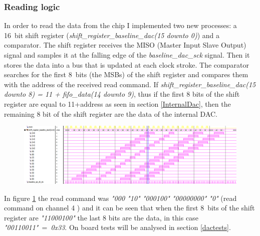 \subsubsection{Reading logic}
In order to read the data from the chip I implemented two new processes: a 16~bit shift register (\textit{shift\_register\_baseline\_dac(15 downto 0)}) and a comparator.
The shift register receives the MISO (Master Input Slave Output) signal and samples it at the falling edge of the \textit{baseline\_dac\_sck} signal. Then it stores the data into a bus that is updated at each clock stroke.
The comparator searches for the first 8~bits (the MSBs) of the shift register and compares them with the address of the received read command.
If \textit{shift\_register\_baseline\_dac(15 downto 8) = 11 + fifo\_data(14 downto 9)}, thus if the first 8 bits of the shift register are equal to 11+address as seen in section \ref{InternalDac}, then the remaining 8 bit of the shift register are the data of the internal DAC.
\begin{figure}[H]
	\centering
	\includegraphics[width=1.0\linewidth]{IMG/ch4/DACsimulations/FSMshiftregister}
	\caption{}
	\label{fig:fsmshiftregister}
\end{figure}
\noindent In figure \ref{fig:fsmshiftregister} the read command was \textit{"000 "10" "000100" "00000000" "0"} (read command on channel 4 ) and it can be seen that when the first 8~bits of the shift register are \textit{"11000100"} the last 8 bits are the data, in this case \textit{"00110011"}~=~\textit{0x33}.
On board tests will be analysed  in section \ref{dactests}.

